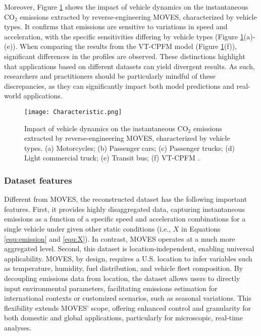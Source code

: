 \documentclass[12pt,english]{article}
\begin{document}
Moreover, Figure \ref{fig:speed_acceleration} shows the impact of vehicle dynamics on the instantaneous CO$_2$ emissions extracted by reverse-engineering MOVES, characterized by vehicle types.
It confirms that emissions are sensitive to variations in speed and acceleration, with the specific sensitivities differing by vehicle types (Figure \ref{fig:speed_acceleration}(a)-(e)).
When comparing the results from the VT-CPFM model \citep{PARK2013317} (Figure \ref{fig:speed_acceleration}(f)), significant differences in the profiles are observed. These distinctions highlight that applications based on different datasets can yield divergent results. 
As such, researchers and practitioners should be particularly mindful of these discrepancies, as they can significantly impact both model predictions and real-world applications.





\begin{figure}
    \centering
    \texttt{[image: Characteristic.png]}
    \caption{Impact of vehicle dynamics on the instantaneous CO$_2$ emissions extracted by reverse-engineering MOVES, characterized by vehicle types. (a) Motorcycles; (b) Passenger cars; (c) Passenger trucks; (d) Light commercial truck; (e) Transit bus; (f) VT-CPFM \citep{PARK2013317}.}
    \label{fig:speed_acceleration}
\end{figure}




\subsubsection{Dataset features}

Different from MOVES, the reconstructed dataset has the following important features. First, it provides highly disaggregated data, capturing instantaneous emissions as a function of a specific speed and acceleration combinations for a single vehicle under given other static conditions (i.e., $X$ in Equations \ref{equ:emission} and \ref{equ:X}). In contrast, MOVES operates at a much more aggregated level. Second, this dataset is location-independent, enabling universal applicability. MOVES, by design, requires a U.S. location to infer variables such as temperature, humidity, fuel distribution, and vehicle fleet composition. By decoupling emissions data from location, the dataset allows users to directly input environmental parameters, facilitating emissions estimation for international contexts or customized scenarios, such as seasonal variations. This flexibility extends MOVES’ scope, offering enhanced control and granularity for both domestic and global applications, particularly for microscopic, real-time analyses. 
\end{document}
